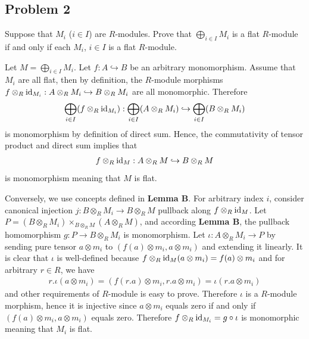 \subsection*{Problem 2}
Suppose that $M_i$ ($i \in I$) are $R$-modules. Prove that $\bigoplus_{i \in I} M_i$ is a flat $R$-module if and only if each $M_i$, $i \in I$ is a flat $R$-module.
\begin{solution}
    Let $M=\bigoplus_{i\in I}M_i$. Let $f:A\hookrightarrow B$ be an arbitrary monomorphism. Assume that $M_i$ are all flat, then by definition, the $R$-module morphisms $f\otimes_R \operatorname{id}_{M_i}:A\otimes_R M_i\hookrightarrow B\otimes_R M_i$ are all
    monomorphic. Therefore
    \begin{align*}
        \bigoplus_{i\in I}(f\otimes_R \operatorname{id}_{M_i}):\bigoplus_{i\in I}(A\otimes_R M_i)\hookrightarrow \bigoplus_{i\in I} (B\otimes_R M_i)
    \end{align*}
    is monomorphism by definition of direct sum.
    Hence, the commutativity of tensor product and direct sum implies that 
    \begin{align*}
        f\otimes_R \operatorname{id}_{M}:A\otimes_R M \hookrightarrow B\otimes_R M
    \end{align*}
    is monomorphism meaning that $M$ is flat.

    Conversely, we use concepts defined in \textbf{Lemma B}. For arbitrary index $i$, consider canonical injection $j:B\otimes_R M_i\to B\otimes_R M$ pullback along $f\otimes_R \operatorname{id}_M$.
    Let $P= (B\otimes_R M_i)\times_{B\otimes_R M} (A\otimes_R M)$, and according \textbf{Lemma B}, the pullback homomorphism $g:P \to B\otimes_R M_i$ is monomorphism. Let $\iota:A\otimes_R M_i\to P$ by sending 
    pure tensor $a\otimes m_i$ to $(f(a)\otimes m_i,a\otimes m_i)$ and extending it linearly. It is clear that $\iota$ is well-defined because $f\otimes_R \operatorname{id}_M(a\otimes m_i) = f(a)\otimes m_i$ and for arbitrary $r\in R$, we have 
    \begin{align*}
        r.\iota(a\otimes m_i) = (f(r.a)\otimes m_i,r.a\otimes m_i) = \iota(r.a\otimes m_i)
    \end{align*}
    and other requirements of $R$-module is easy to prove. Therefore $\iota$ is a $R$-module morphism, hence it is injective since $a\otimes m_i$ equals zero if and only if $(f(a)\otimes m_i,a\otimes m_i)$ equals zero.
    Therefore $f\otimes_R \operatorname{id}_{M_i}= g\circ \iota$ is monomorphic meaning that $M_i$ is flat.
\end{solution}




